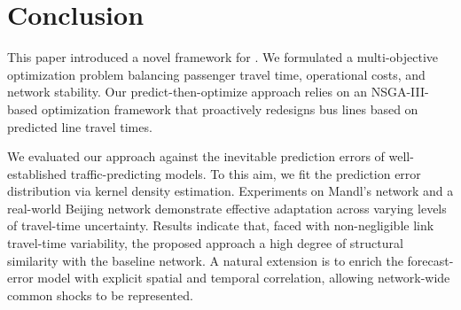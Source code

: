 \documentclass[a4paper,fleqn]{cas-sc}
\begin{document}

\section{Conclusion}\label{sec:conclu}
This paper introduced a novel framework for . We formulated a multi-objective optimization problem balancing passenger travel time, operational costs, and network stability. Our predict-then-optimize approach relies on an NSGA-III-based optimization framework that proactively redesigns bus lines based on predicted line travel times. 

We evaluated our approach against the inevitable prediction errors of well-established traffic-predicting models. To this aim, we fit the prediction error distribution via kernel density estimation.
Experiments on Mandl's network and a real-world Beijing network demonstrate effective adaptation across varying levels of travel-time uncertainty. 
%
Results indicate that, faced with non-negligible link travel-time variability, the proposed approach  a high degree of structural similarity with the baseline network.
%
%
A natural extension is to enrich the forecast-error model with explicit spatial and temporal correlation, allowing network-wide common shocks to be represented.
\end{document}
